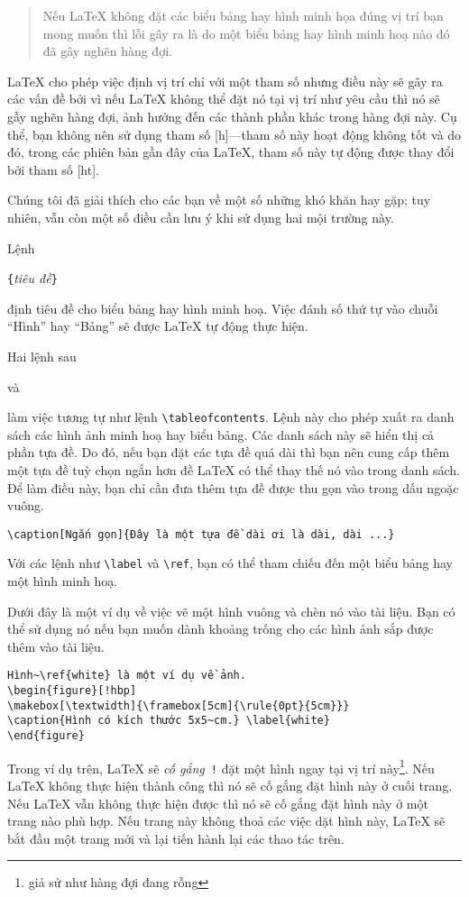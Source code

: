 \begin{quote}
Nếu \LaTeX{} không đặt các biểu bảng hay hình minh họa đúng vị trí
bạn mong muốn thì lỗi gây ra là do một biểu bảng hay hình minh hoạ
nào đó đã gây nghẽn hàng đợi.
\end{quote}

\LaTeX{} cho phép việc định vị trí chỉ với một tham số nhưng điều này sẽ gây ra các vấn đề bởi vì nếu \LaTeX{} không thể đặt nó tại vị trí như yêu cầu thì nó sẽ gẫy nghẽn hàng đợi, ảnh hưởng đến các thành phần khác trong hàng đợi này. Cụ thể, bạn không nên sử dụng tham số [h]---tham số này hoạt động không tốt và do đó, trong các phiên bản gần đây của \LaTeX{}, tham số này tự động được thay đổi bởi tham số [ht].

\bigskip
\noindent Chúng tôi đã giải thích cho các bạn về một số những khó khăn hay gặp; tuy nhiên, vẫn còn một số điều cần lưu ý khi sử dụng hai mội trường này.

Lệnh
\begin{lscommand}
\verb|{|\emph{tiêu đề}\verb|}|
\end{lscommand}
\noindent định tiêu đề cho biểu bảng hay hình minh hoạ. Việc đánh số thứ tự vào chuỗi ``Hình'' hay ``Bảng'' sẽ được \LaTeX{} tự động thực hiện.

Hai lệnh sau
\begin{lscommand}
 và 
\end{lscommand}
\noindent làm việc tương tự như lệnh \verb|\tableofcontents|. Lệnh này cho phép xuất ra danh sách các hình ảnh minh hoạ hay biểu bảng. Các danh sách này sẽ hiển thị cả phần tựa đề. Do đó, nếu bạn đặt các tựa đề quá dài thì bạn nên cung cấp thêm một tựa đề tuỳ chọn ngắn hơn đề \LaTeX{} có thể thay thế nó vào trong danh sách. Để làm điều này, bạn chỉ cần đưa thêm tựa đề được thu gọn vào trong dấu ngoặc vuông.
\begin{code}
\verb|\caption[Ngắn gọn]{Đây là một tựa đề dài ơi là dài, dài ...}|
\end{code}

Với các lệnh như \verb|\label| và \verb|\ref|, bạn có thể tham chiếu đến một biểu bảng hay một hình minh hoạ.

Dưới đây là một ví dụ về việc vẽ một hình vuông và chèn nó vào tài liệu. Bạn có thể sử dụng nó nếu bạn muốn dành khoảng trống cho các hình ảnh sắp được thêm vào tài liệu.
\begin{code}
\begin{verbatim}
Hình~\ref{white} là một ví dụ về ảnh.
\begin{figure}[!hbp]
\makebox[\textwidth]{\framebox[5cm]{\rule{0pt}{5cm}}}
\caption{Hình có kích thước 5x5~cm.} \label{white}
\end{figure}
\end{verbatim}
\end{code}
\noindent Trong ví dụ trên, \LaTeX{} sẽ \emph{cố gắng}~\texttt{!} đặt một hình ngay tại vị trí này\footnote{giả sử như hàng đợi đang rỗng}. Nếu \LaTeX{} không thực hiện thành công thì nó sẽ cố gắng đặt hình này ở cuối trang. Nếu \LaTeX{} vẫn không thực hiện được thì nó sẽ cố gắng đặt hình này ở một trang nào phù hợp. Nếu trang này không thoả các việc dặt hình này, \LaTeX{} sẽ bắt đầu một trang mới và lại tiến hành lại các thao tác trên.

